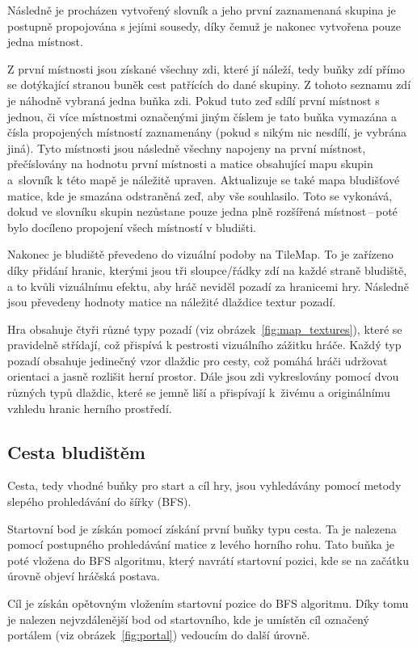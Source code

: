 Následně je procházen vytvořený slovník a jeho první zaznamenaná skupina je postupně propojována s jejími sousedy, díky čemuž je nakonec vytvořena pouze jedna místnost. 

Z první místnosti jsou získané všechny zdi, které jí náleží, tedy buňky zdí přímo se dotýkající stranou buněk cest patřících do dané skupiny. Z tohoto seznamu zdí je náhodně vybraná jedna buňka zdi. Pokud tuto zeď sdílí první místnost s jednou, či více místnostmi označenými jiným číslem je tato buňka vymazána a čísla propojených místností zaznamenány (pokud s nikým nic nesdílí, je vybrána jiná). Tyto místnosti jsou následně všechny napojeny na první místnost, přečíslovány na hodnotu první místnosti a matice obsahující mapu skupin a~slovník k této mapě je náležitě upraven. Aktualizuje se také mapa bludišťové matice, kde je smazána odstraněná zeď, aby vše souhlasilo. Toto se vykonává, dokud ve slovníku skupin nezůstane pouze jedna plně rozšířená místnost\,--\,poté bylo docíleno propojení všech místností v bludišti.

Nakonec je bludiště převedeno do vizuální podoby na TileMap. To je zařízeno díky přidání hranic, kterými jsou tři sloupce/řádky zdí na každé straně bludiště, a to kvůli vizuálnímu efektu, aby hráč neviděl pozadí za hranicemi hry. Následně jsou převedeny hodnoty matice na náležité dlaždice textur pozadí. 

Hra obsahuje čtyři různé typy pozadí (viz obrázek~\ref{fig:map_textures}), které se pravidelně střídají, což přispívá k pestrosti vizuálního zážitku hráče. Každý typ pozadí obsahuje jedinečný vzor dlaždic pro cesty, což pomáhá hráči udržovat orientaci a jasně rozlišit herní prostor. Dále jsou zdi vykreslovány pomocí dvou různých typů dlaždic, které se jemně liší a přispívají k~živému a originálnímu vzhledu hranic herního prostředí.

\subsection*{Cesta bludištěm} 
Cesta, tedy vhodné buňky pro start a cíl hry, jsou vyhledávány pomocí metody slepého prohledávání do šířky (BFS). 

Startovní bod je získán pomocí získání první buňky typu cesta. Ta je nalezena pomocí postupného prohledávání matice z levého horního rohu. Tato buňka je poté vložena do BFS algoritmu, který navrátí startovní pozici, kde se na začátku úrovně objeví hráčská postava.

Cíl je získán opětovným vložením startovní pozice do BFS algoritmu. Díky tomu je nalezen nejvzdálenější bod od startovního, kde je umístěn cíl označený portálem (viz obrázek~\ref{fig:portal}) vedoucím do další úrovně.

